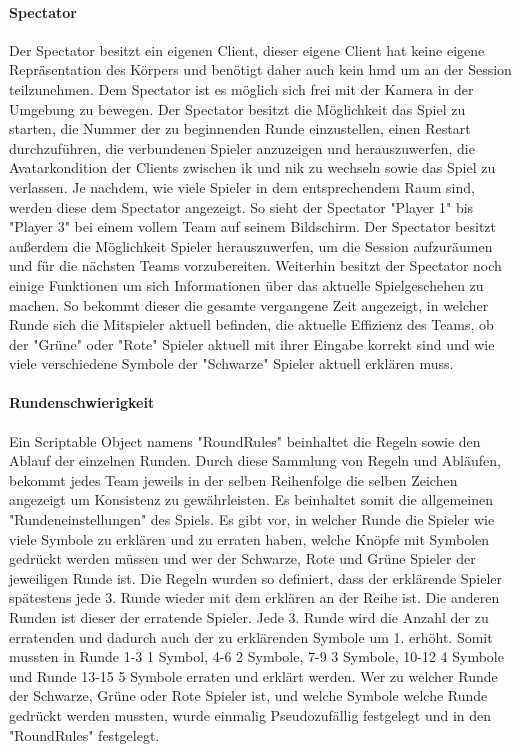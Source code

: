 \documentclass[a4paper,11pt]{article}%
\renewcommand{\\}{\vspace*{0.5\baselineskip} \newline}
\begin{document}
\paragraph{Spectator}
Der Spectator besitzt ein eigenen Client, dieser eigene Client hat keine eigene Repräsentation des Körpers und benötigt daher auch kein \ac{hmd} um an der Session teilzunehmen. Dem Spectator ist es möglich sich frei mit der Kamera in der Umgebung zu bewegen.
Der Spectator besitzt die Möglichkeit das Spiel zu starten, die Nummer der zu beginnenden Runde einzustellen, einen Restart durchzuführen, die verbundenen Spieler anzuzeigen und herauszuwerfen, die Avatarkondition der Clients zwischen \ac{ik} und \ac{nik} zu wechseln sowie das Spiel zu verlassen.
Je nachdem, wie viele Spieler in dem entsprechendem Raum sind, werden diese dem Spectator angezeigt. So sieht der Spectator "Player 1" bis "Player 3" bei einem vollem Team auf seinem Bildschirm. Der Spectator besitzt außerdem die Möglichkeit Spieler herauszuwerfen, um die Session aufzuräumen und für die nächsten Teams vorzubereiten.
Weiterhin besitzt der Spectator noch einige Funktionen um sich Informationen über das aktuelle Spielgeschehen zu machen. So bekommt dieser die gesamte vergangene Zeit angezeigt, in welcher Runde sich die Mitspieler aktuell befinden, die aktuelle Effizienz des Teams, ob der "Grüne" oder "Rote" Spieler aktuell mit ihrer Eingabe korrekt sind und wie viele verschiedene Symbole der "Schwarze" Spieler aktuell erklären muss.

\paragraph{Rundenschwierigkeit}
Ein Scriptable Object namens "RoundRules" beinhaltet die Regeln sowie den Ablauf der einzelnen Runden. 
Durch diese Sammlung von Regeln und Abläufen, bekommt jedes Team jeweils in der selben Reihenfolge die selben Zeichen angezeigt um Konsistenz zu gewährleisten. Es beinhaltet somit die allgemeinen "Rundeneinstellungen" des Spiels. Es gibt vor, in welcher Runde die Spieler wie viele Symbole zu erklären und zu erraten haben, welche Knöpfe mit Symbolen gedrückt werden müssen und wer der Schwarze, Rote und Grüne Spieler der jeweiligen Runde ist. Die Regeln wurden so definiert, dass der erklärende Spieler spätestens jede 3. Runde wieder mit dem erklären an der Reihe ist. Die anderen Runden ist dieser der erratende Spieler. Jede 3. Runde wird die Anzahl der zu erratenden und dadurch auch der zu erklärenden Symbole um 1. erhöht. Somit mussten in Runde 1-3 1 Symbol, 4-6 2 Symbole, 7-9 3 Symbole, 10-12 4 Symbole und Runde 13-15 5 Symbole erraten und erklärt werden.
Wer zu welcher Runde der Schwarze, Grüne oder Rote Spieler ist, und welche Symbole welche Runde gedrückt werden mussten, wurde einmalig Pseudozufällig festgelegt und in den "RoundRules" festgelegt.
\end{document}
